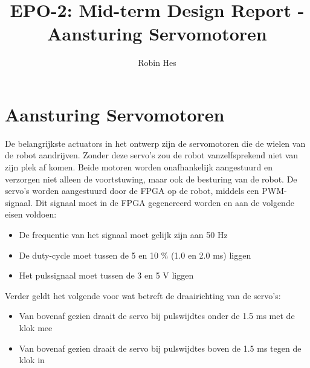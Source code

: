 \documentclass{report}
\title{EPO-2: Mid-term Design Report - Aansturing Servomotoren}
\author{Robin Hes}
\begin{document}
\chapter{Aansturing Servomotoren}
\label{ch:servo}

De belangrijkste actuators in het ontwerp zijn de servomotoren die de wielen van de robot aandrijven. Zonder deze servo's zou de robot vanzelfsprekend niet van zijn plek af komen. Beide motoren worden onafhankelijk aangestuurd en verzorgen niet alleen de voortstuwing, maar ook de besturing van de robot. De servo's worden aangestuurd door de FPGA op de robot, middels een PWM-signaal. Dit signaal moet in de FPGA gegenereerd worden en aan de volgende eisen voldoen:

\begin{itemize}
	\item De frequentie van het signaal moet gelijk zijn aan 50 Hz
	\item De duty-cycle moet tussen de 5 en 10 \% (1.0 en 2.0 ms) liggen
	\item Het pulssignaal moet tussen de 3 en 5 V liggen
\end{itemize}

\noindent
Verder geldt het volgende voor wat betreft de draairichting van de servo's:

\begin{itemize}
	\item Van bovenaf gezien draait de servo bij pulswijdtes onder de 1.5 ms met de klok mee
	\item Van bovenaf gezien draait de servo bij pulswijdtes boven de 1.5 ms tegen de klok in
\end{itemize}
\end{document}
